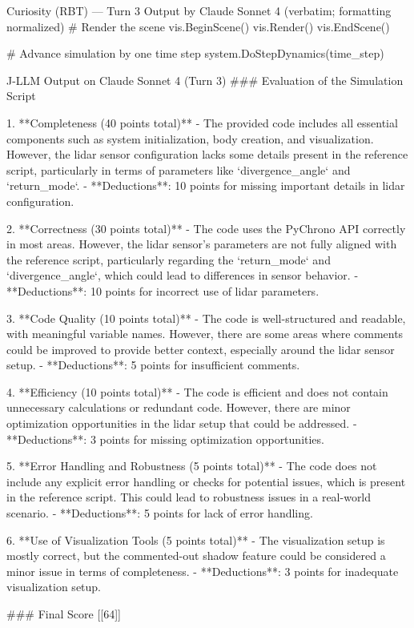 \documentclass{ieeeaccess}
\begin{document}
\begin{appendices}
\begin{CodeBlock}[breakable]{Curiosity (RBT) --- Turn 3 Output by Claude Sonnet 4 (verbatim; formatting normalized)}
          # Render the scene
          vis.BeginScene()
          vis.Render()
          vis.EndScene()
      
          # Advance simulation by one time step
          system.DoStepDynamics(time_step)
      \end{CodeBlock}
      \begin{PromptBlock}{J-LLM Output on Claude Sonnet 4 (Turn 3)}
      ### Evaluation of the Simulation Script
      
      1. **Completeness (40 points total)**
         - The provided code includes all essential components such as system initialization, body creation, and visualization. However, the lidar sensor configuration lacks some details present in the reference script, particularly in terms of parameters like `divergence_angle` and `return_mode`. 
         - **Deductions**: 10 points for missing important details in lidar configuration.
      
      2. **Correctness (30 points total)**
         - The code uses the PyChrono API correctly in most areas. However, the lidar sensor's parameters are not fully aligned with the reference script, particularly regarding the `return_mode` and `divergence_angle`, which could lead to differences in sensor behavior.
         - **Deductions**: 10 points for incorrect use of lidar parameters.
      
      3. **Code Quality (10 points total)**
         - The code is well-structured and readable, with meaningful variable names. However, there are some areas where comments could be improved to provide better context, especially around the lidar sensor setup.
         - **Deductions**: 5 points for insufficient comments.
      
      4. **Efficiency (10 points total)**
         - The code is efficient and does not contain unnecessary calculations or redundant code. However, there are minor optimization opportunities in the lidar setup that could be addressed.
         - **Deductions**: 3 points for missing optimization opportunities.
      
      5. **Error Handling and Robustness (5 points total)**
         - The code does not include any explicit error handling or checks for potential issues, which is present in the reference script. This could lead to robustness issues in a real-world scenario.
         - **Deductions**: 5 points for lack of error handling.
      
      6. **Use of Visualization Tools (5 points total)**
         - The visualization setup is mostly correct, but the commented-out shadow feature could be considered a minor issue in terms of completeness.
         - **Deductions**: 3 points for inadequate visualization setup.
      
      ### Final Score
      [[64]]
      \end{PromptBlock}     \label{secA1}
\end{appendices}
\end{document}
